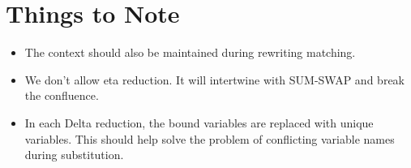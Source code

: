 \documentclass[runningheads]{llncs}
\begin{document}
\section{Things to Note}
\begin{itemize}
    \item The context should also be maintained during rewriting matching.
    \item We don't allow eta reduction. It will intertwine with SUM-SWAP and break the confluence.
    \item In each Delta reduction, the bound variables are replaced with unique variables. This should help solve the problem of conflicting variable names during substitution.
\end{itemize}


    
    


%
%
%


%

\appendix

\end{document}
